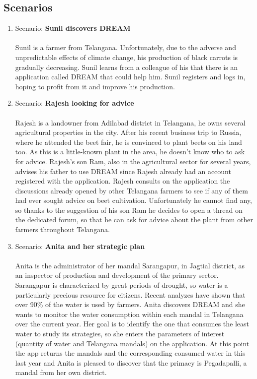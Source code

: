 \subsection{Scenarios}

\begin{enumerate}

\item Scenario: \textbf{Sunil discovers DREAM}\\\\
Sunil is a farmer from Telangana. Unfortunately, due to the adverse and unpredictable effects of climate change, his production of black carrots is gradually decreasing. Sunil learns from a colleague of his that there is an application called DREAM that could help him. Sunil registers and logs in, hoping to profit from it and improve his production.\\

\item Scenario: \textbf{Rajesh looking for advice}\\\\
Rajesh is a landowner from Adilabad district in Telangana, he owns several agricultural properties in the city. After his recent business trip to Russia, where he attended the beet fair, he is convinced to plant beets on his land too. As this is a little-known plant in the area, he doesn't know who to ask for advice. Rajesh's son Ram, also in the agricultural sector for several years, advises his father to use DREAM since Rajesh already had an account registered with the application.
Rajesh consults on the application the discussions already opened by other Telangana farmers to see if any of them had ever sought advice on beet cultivation. Unfortunately he cannot find any, so thanks to the suggestion of his son Ram he decides to open a thread on the dedicated forum, so that he can ask for advice about the plant from other farmers throughout Telangana.\\

\item Scenario: \textbf{Anita and her strategic plan}\\\\
Anita is the administrator of her mandal Sarangapur, in Jagtial district, as an inspector of production and development of the primary sector. Sarangapur is characterized by great periods of drought, so water is a particularly precious resource for citizens.
Recent analyzes have shown that over 90\% of the water is used by farmers.
Anita discovers DREAM and she wants to monitor the water consumption within each mandal in Telangana over the current year. Her goal is to identify the one that consumes the least water to study its strategies, so she enters the parameters of interest (quantity of water and Telangana mandals) on the application.
At this point the app returns the mandals and the corresponding consumed water in this last year and Anita is pleased to discover that the primacy is Pegadapalli, a mandal from her own district.\\


\end{enumerate}
